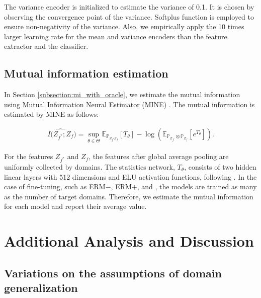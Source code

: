 The variance encoder is initialized to estimate the variance of 0.1. It is chosen by observing the convergence point of the variance.
Softplus function is employed to ensure non-negativity of the variance. Also, we empirically apply the 10 times larger learning rate for the mean and variance encoders than the feature extractor and the classifier.

\subsection{Mutual information estimation}
\label{subsec:mine}

In Section \ref{subsection:mi_with_oracle}, we estimate the mutual information using Mutual Information Neural Estimator (MINE) \cite{belghazi2018mine}. The mutual information is estimated by MINE as follows:

\begin{align}
    \widehat{I(Z_{f^*} ; Z_f})=\sup _{\theta \in \Theta} \mathbb{E}_{\mathbb{P}_{Z_{f^*} Z_f}}\left[T_{\theta}\right]-\log \left(\mathbb{E}_{\mathbb{P}_{Z_{f^*}} \otimes {\mathbb{P}}_{Z_f}}\left[e^{T_{\theta}}\right]\right).
\end{align}


For the features $Z_{f^*}$ and $Z_f$, the features after global average pooling are uniformly collected by domains. The statistics network, $T_\theta$, consists of two hidden linear layers with 512 dimensions and ELU activation functions, following \cite{belghazi2018mine}. In the case of fine-tuning, such as ERM$-$, ERM$+$, and \method{}, the models are trained as many as the number of target domains. Therefore, we estimate the mutual information for each model and report their average value.

\section{Additional Analysis and Discussion}

\subsection{Variations on the assumptions of domain generalization}



